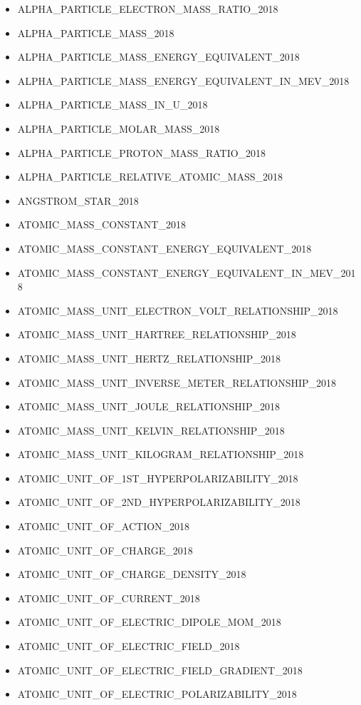 \begin{itemize}
\item ALPHA\_PARTICLE\_ELECTRON\_MASS\_RATIO\_2018
\item ALPHA\_PARTICLE\_MASS\_2018
\item ALPHA\_PARTICLE\_MASS\_ENERGY\_EQUIVALENT\_2018
\item ALPHA\_PARTICLE\_MASS\_ENERGY\_EQUIVALENT\_IN\_MEV\_2018
\item ALPHA\_PARTICLE\_MASS\_IN\_U\_2018
\item ALPHA\_PARTICLE\_MOLAR\_MASS\_2018
\item ALPHA\_PARTICLE\_PROTON\_MASS\_RATIO\_2018
\item ALPHA\_PARTICLE\_RELATIVE\_ATOMIC\_MASS\_2018
\item ANGSTROM\_STAR\_2018
\item ATOMIC\_MASS\_CONSTANT\_2018
\item ATOMIC\_MASS\_CONSTANT\_ENERGY\_EQUIVALENT\_2018
\item ATOMIC\_MASS\_CONSTANT\_ENERGY\_EQUIVALENT\_IN\_MEV\_2018
\item ATOMIC\_MASS\_UNIT\_ELECTRON\_VOLT\_RELATIONSHIP\_2018
\item ATOMIC\_MASS\_UNIT\_HARTREE\_RELATIONSHIP\_2018
\item ATOMIC\_MASS\_UNIT\_HERTZ\_RELATIONSHIP\_2018
\item ATOMIC\_MASS\_UNIT\_INVERSE\_METER\_RELATIONSHIP\_2018
\item ATOMIC\_MASS\_UNIT\_JOULE\_RELATIONSHIP\_2018
\item ATOMIC\_MASS\_UNIT\_KELVIN\_RELATIONSHIP\_2018
\item ATOMIC\_MASS\_UNIT\_KILOGRAM\_RELATIONSHIP\_2018
\item ATOMIC\_UNIT\_OF\_1ST\_HYPERPOLARIZABILITY\_2018
\item ATOMIC\_UNIT\_OF\_2ND\_HYPERPOLARIZABILITY\_2018
\item ATOMIC\_UNIT\_OF\_ACTION\_2018
\item ATOMIC\_UNIT\_OF\_CHARGE\_2018
\item ATOMIC\_UNIT\_OF\_CHARGE\_DENSITY\_2018
\item ATOMIC\_UNIT\_OF\_CURRENT\_2018
\item ATOMIC\_UNIT\_OF\_ELECTRIC\_DIPOLE\_MOM\_2018
\item ATOMIC\_UNIT\_OF\_ELECTRIC\_FIELD\_2018
\item ATOMIC\_UNIT\_OF\_ELECTRIC\_FIELD\_GRADIENT\_2018
\item ATOMIC\_UNIT\_OF\_ELECTRIC\_POLARIZABILITY\_2018

\end{itemize}
